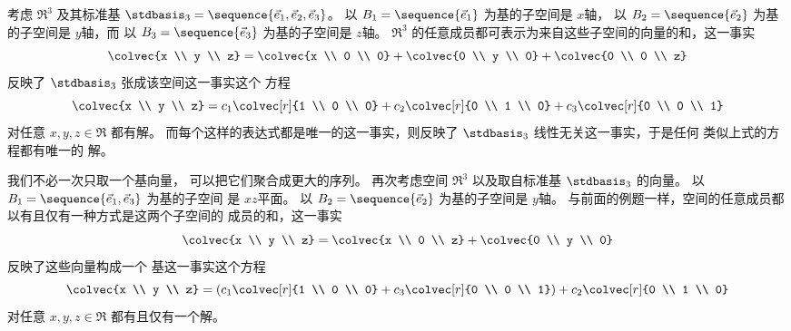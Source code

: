 \begin{example} \label{exam:BenchDirSum}
考虑 $\Re^3$ 及其标准基
$\stdbasis_3=\sequence{\vec{e}_1,\vec{e}_2,\vec{e}_3}$。
以 $B_1=\sequence{\vec{e}_1}$ 为基的子空间是 $x$轴，
以 $B_2=\sequence{\vec{e}_2}$ 为基的子空间是 $y$轴，而
以 $B_3=\sequence{\vec{e}_3}$ 为基的子空间是 $z$轴。
$\Re^3$ 的任意成员都可表示为来自这些子空间的向量的和，这一事实
\begin{equation*}
  \colvec{x \\ y \\ z}
   =\colvec{x \\ 0 \\ 0}
    +\colvec{0 \\ y \\ 0}
    +\colvec{0 \\ 0 \\ z}
\end{equation*}
反映了 $\stdbasis_3$ 张成该空间这一事实\Dash 这个
方程
\begin{equation*}
  \colvec{x \\ y \\ z}
   =c_1\colvec[r]{1 \\ 0 \\ 0}
    +c_2\colvec[r]{0 \\ 1 \\ 0}
    +c_3\colvec[r]{0 \\ 0 \\ 1}
\end{equation*}
对任意 $x,y,z\in\Re$ 都有解。
而每个这样的表达式都是唯一的这一事实，则反映了 $\stdbasis_3$ 线性无关这一事实，于是任何
类似上式的方程都有唯一的
解。
\end{example}

\begin{example}
我们不必一次只取一个基向量，
可以把它们聚合成更大的序列。
再次考虑空间 $\Re^3$ 以及取自标准基 $\stdbasis_3$ 的向量。
以 $B_1=\sequence{\vec{e}_1,\vec{e}_3}$ 为基的子空间
是 $xz$平面。
以 $B_2=\sequence{\vec{e}_2}$ 为基的子空间是 $y$轴。
与前面的例题一样，空间的任意成员都以有且仅有一种方式是这两个子空间的
成员的和，这一事实
\begin{equation*}
  \colvec{x \\ y \\ z}
   =\colvec{x \\ 0 \\ z}
    +\colvec{0 \\ y \\ 0}
\end{equation*}
反映了这些向量构成一个
基这一事实\Dash 这个方程
\begin{equation*}
  \colvec{x \\ y \\ z}
   =(c_1\colvec[r]{1 \\ 0 \\ 0}
    +c_3\colvec[r]{0 \\ 0 \\ 1})
    +c_2\colvec[r]{0 \\ 1 \\ 0}
\end{equation*}
对任意 $x,y,z\in\Re$ 都有且仅有一个解。
\end{example}

